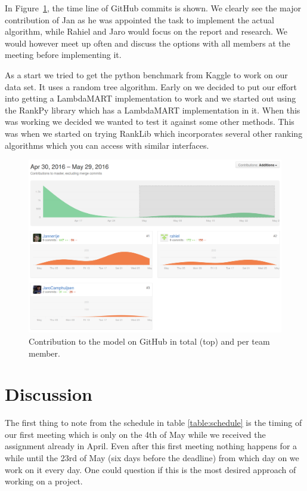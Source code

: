 \documentclass[runningheads,a4paper]{llncs}
\begin{document}
In Figure~\ref{fig:gh_contrib}, the time line of GitHub commits is shown. We clearly see the major contribution of Jan as he was appointed the task to implement the actual algorithm, while Rahiel and Jaro would focus on the report and research. We would however meet up often and discuss the options with all members at the meeting before implementing it. 

As a start we tried to get the python benchmark from Kaggle to work on our data set. It uses a random tree algorithm. 
Early on we decided to put our effort into getting a LambdaMART implementation to work and we started out using the RankPy library which has a LambdaMART implementation in it. When this was working we decided we wanted to test it against some other methods. This was when we started on trying RankLib which incorporates several other ranking algorithms which you can access with similar interfaces. 

\begin{figure}[h]
	\centering
	\includegraphics[width=14cm]{Pictures/contributions2.png}
    \caption{Contribution to the model on GitHub in total (top) and per team member.}
    \label{fig:gh_contrib}
\end{figure}

\section{Discussion}
The first thing to note from the schedule in table \ref{table:schedule} is the timing of our first meeting which is only on the 4th of May while we received the assignment already in April. Even after this first meeting nothing happens for a while until the 23rd of May (six days before the deadline) from which day on we work on it every day. One could question if this is the most desired approach of working on a project. 
\end{document}
